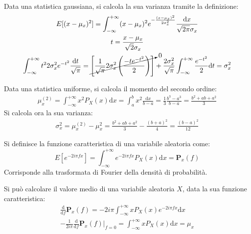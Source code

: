 \documentclass{article}
\newcommand{\df}{\mathrm{d}}
\numberwithin{equation}{subsection}
\begin{document}
Data una statistica gaussiana, si calcola la sua varianza tramite la definizione:
\begin{gather*}
    E[(x-\mu_x)^2]=\displaystyle\int_{-\infty}^{+\infty}(x-\mu_x)^2e^{-\frac{(x-\mu_x)^2}{2\sigma_x^2}}\frac{\df x}{\sqrt{2\pi}\sigma_x}\\
    t=\displaystyle\frac{x-\mu_x}{\sqrt{2}\sigma_x}\\
    \displaystyle\int_{-\infty}^{+\infty}t^22\sigma_x^2e^{-t^2}\frac{\df t}{\sqrt{\pi}}=\cancelto{0}{\left[\frac{1}{\sqrt{\pi}}2\sigma_x^2\left(\frac{-te^{-t^2}}{2}\right)\right]}+\frac{2\sigma_x^2}{\sqrt{\pi}}\int_{-\infty}^{+\infty}\frac{e^{-t^2}}{2}\df t=\sigma_x^2
\end{gather*}


Data una statistica uniforme, si calcola il momento del secondo ordine:
\begin{gather}
    \mu_x^{(2)}=\displaystyle\int_{-\infty}^{+\infty}x^2P_X(x)\df x=\int_a^bx^2\frac{\df x}{b-a}=\frac{1}{3}\frac{b^3-a^3}{b-a}=\frac{b^2+ab+a^2}{3}
\end{gather}
Si calcola ora la sua varianza:
\begin{gather}
    \sigma_x^2=\mu_x^{(2)}-\mu_x^2=\displaystyle\frac{b^2+ab+a^2}{3}-\frac{(b+a)^2}{4}=\frac{(b-a)^2}{12}
\end{gather}



Si definisce la funzione caratteristica di una variabile aleatoria come:
\begin{equation}
    E\left[e^{-2i\pi fx}\right]=\displaystyle\int_{-\infty}^{+\infty}e^{-2i\pi fx}P_X(x)\df x=\mathbf{P}_x(f)
\end{equation}
Corrisponde alla trasformata di Fourier della densità di probabilità. 

Si può calcolare il valore medio di una variabile aleatoria $X$, data la sua funzione caratteristica:
\begin{gather*}
    \displaystyle\frac{\df}{\df f}\mathbf{P}_x(f)=-2i\pi\int_{-\infty}^{+\infty}xP_X(x)e^{-2i\pi fx}\df x\\
    \displaystyle-\frac{1}{2i\pi}\frac{\df}{\df f}\mathbf{P}_x(f)\bigg|_{f=0}=\int_{-\infty}^{+\infty}xP_X(x)\df x=\mu_x
\end{gather*}
\end{document}
